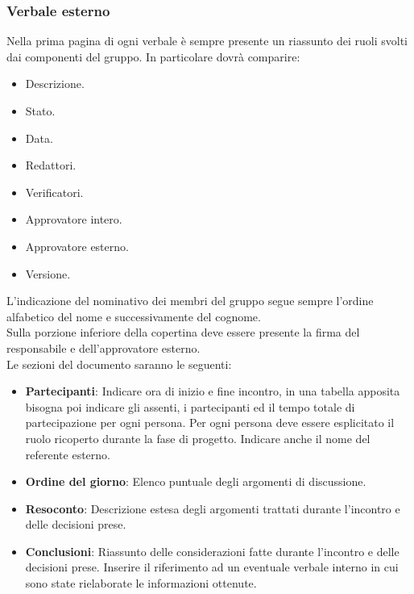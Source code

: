 \subsubsection{Verbale esterno}
Nella prima pagina di ogni verbale è sempre presente un riassunto dei ruoli svolti dai componenti del gruppo. 
In particolare dovrà comparire:
\begin{itemize}
    \item Descrizione.
    \item Stato.
    \item Data.
    \item Redattori.
    \item Verificatori.
    \item Approvatore intero.
    \item Approvatore esterno.
    \item Versione.
\end{itemize}
L'indicazione del nominativo dei membri del gruppo segue sempre l'ordine alfabetico del nome e successivamente del cognome. \\
Sulla porzione inferiore della copertina deve essere presente la firma del responsabile e dell'approvatore esterno. \\

\noindent
Le sezioni del documento saranno le seguenti:
\begin{itemize}
    \item \textbf{Partecipanti}: Indicare ora di inizio e fine incontro, in una tabella apposita bisogna poi indicare gli assenti, i partecipanti ed il tempo totale di partecipazione per ogni persona. Per ogni persona deve essere esplicitato il ruolo ricoperto durante la fase di progetto. Indicare anche il nome del referente esterno.
    \item \textbf{Ordine del giorno}: Elenco puntuale degli argomenti di discussione.
    \item \textbf{Resoconto}: Descrizione estesa degli argomenti trattati durante l'incontro e delle decisioni prese.
    \item \textbf{Conclusioni}: Riassunto delle considerazioni fatte durante l'incontro e delle decisioni prese. 
    Inserire il riferimento ad un eventuale verbale interno in cui sono state rielaborate le informazioni ottenute.
\end{itemize}



